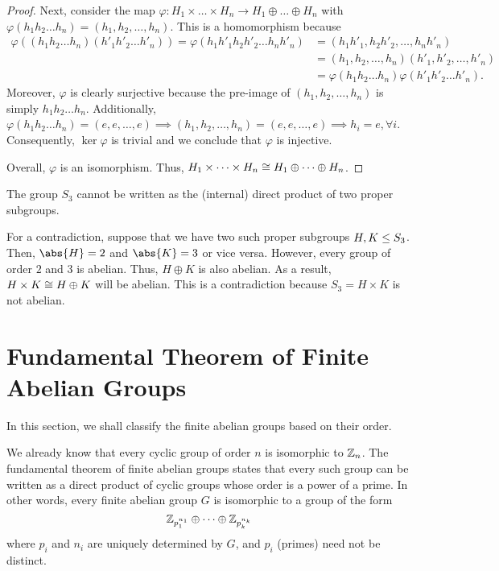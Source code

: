 \documentclass[11pt]{penrose}
\begin{document}
\begin{proof}
    Next, consider the map $\varphi : H_{1} \times \dots \times H_{n} \to H_{1} \oplus \dots \oplus H_{n}$ with $\varphi(h_{1} h_{2} \dots h_{n}) = (h_{1}, h_{2}, \dots, h_{n})$. This is a homomorphism because
    \begin{align*}
        \varphi((h_{1} h_{2} \dots h_{n}) (h'_{1} h'_{2} \dots h'_{n}))
        = \varphi(h_{1}h'_{1} h_{2}h'_{2} \dots h_{n}h'_{n})
        &= (h_{1}h'_{1}, h_{2}h'_{2}, \dots, h_{n}h'_{n})\\
        &= (h_{1}, h_{2}, \dots, h_{n}) (h'_{1}, h'_{2}, \dots, h'_{n})\\
        &= \varphi(h_{1} h_{2} \dots h_{n} ) \varphi(h'_{1} h'_{2} \dots h'_{n}).
    \end{align*}
    Moreover, $\varphi$ is clearly surjective because the pre-image of $(h_{1}, h_{2}, \dots, h_{n})$ is simply $h_{1} h_{2} \dots h_{n}$. Additionally, $\varphi(h_{1} h_{2} \dots h_{n}) = (e, e, \dots, e) \implies (h_{1}, h_{2}, \dots, h_{n}) = (e, e, \dots, e) \implies h_{i} = e, \forall i$.
    Consequently, $\ker\varphi$ is trivial and we conclude that $\varphi$ is injective.

    Overall, $\varphi$ is an isomorphism. Thus, $H_{1} \times \dots \times H_{n} \mathrel{\cong} H_{1} \oplus \dots \oplus H_{n}$.
\end{proof}

\begin{negg}
    The group $S_{3}$ cannot be written as the (internal) direct product of two proper subgroups.

    For a contradiction, suppose that we have two such proper subgroups $H, K \mathrel{\leq} S_{3}$. Then, $\abs{H} = 2$ and $\abs{K} = 3$ or vice versa. However, every group of order $2$ and $3$ is abelian. Thus, $H \oplus K$ is also abelian. As a result, $H \times K \mathrel{\cong} H \oplus K$ will be abelian. This is a contradiction because $S_{3} = H \times K$ is not abelian. \eggqed
\end{negg}

\section{Fundamental Theorem of Finite Abelian Groups}
In this section, we shall classify the finite abelian groups based on their order.

We already know that every cyclic group of order $n$ is isomorphic to $\mathbb{Z}_{n}$. The fundamental theorem of finite abelian groups states that every such group can be written as a direct product of cyclic groups whose order is a power of a prime. In other words, every finite abelian group $G$ is isomorphic to a group of the form
\begin{equation*}
    \mathbb{Z}_{p_{1}^{n_{1}}} \oplus \dots \oplus \mathbb{Z}_{p_{k}^{n_{k}}}
\end{equation*}
where $p_{i}$ and $n_{i}$ are uniquely determined by $G$, and $p_{i}$ (primes) need not be distinct.
\end{document}
